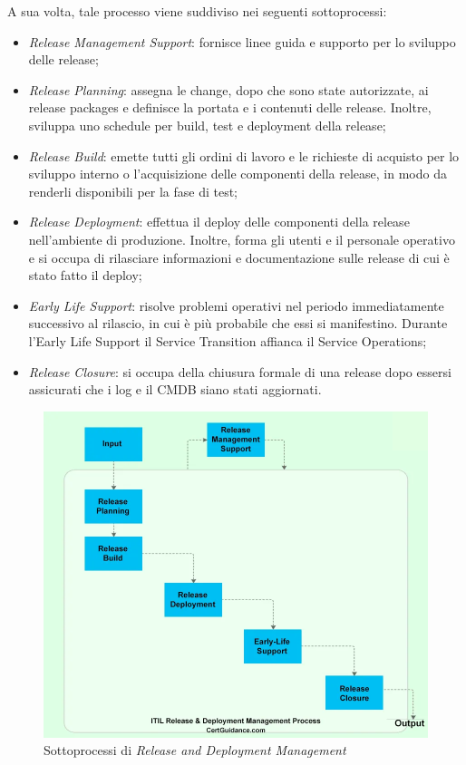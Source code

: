 	A sua volta, tale processo viene suddiviso nei seguenti sottoprocessi:
	
	\begin{itemize}[noitemsep]
		\item \textit{Release Management Support}: fornisce linee guida e supporto per lo sviluppo delle release;
		\item \textit{Release Planning}: assegna le change, dopo che sono state autorizzate, ai release packages e definisce la portata e i contenuti delle release. Inoltre, sviluppa uno schedule per build, test e deployment della release;
		\item \textit{Release Build}: emette tutti gli ordini di lavoro e le richieste di acquisto per lo sviluppo interno o l'acquisizione delle componenti della release, in modo da renderli disponibili per la fase di test;
		\item \textit{Release Deployment}: effettua il deploy delle componenti della release nell'ambiente di produzione. Inoltre, forma gli utenti e il personale operativo e si occupa di rilasciare informazioni e documentazione sulle release di cui è stato fatto il deploy;
		\item \textit{Early Life Support}: risolve problemi operativi nel periodo immediatamente successivo al rilascio, in cui è più probabile che essi si manifestino. Durante l’Early Life Support il Service Transition affianca il Service Operations;
		\item \textit{Release Closure}: si occupa della chiusura formale di una release dopo essersi assicurati che i log e il CMDB siano stati aggiornati.
	\end{itemize}

	\begin{figure}[h!]
		\centering
		\includegraphics[width=\linewidth]{img/intro_rollout.png}
		\caption{Sottoprocessi di \textit{Release and Deployment Management}\cite{release_deployment_management}}
		\label{fig:intro_rollout}
	\end{figure}

